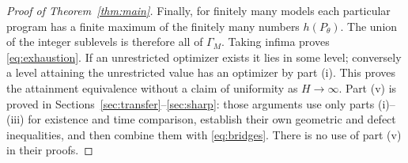 \begin{proof}[Proof of Theorem~\ref{thm:main}]
Finally, for finitely many models each particular program has a finite maximum of the finitely many numbers $h(P_\theta)$. The union of the integer sublevels is therefore all of $\Gamma_M$. Taking infima proves \eqref{eq:exhaustion}. If an unrestricted optimizer exists it lies in some level; conversely a level attaining the unrestricted value has an optimizer by part (i). This proves the attainment equivalence without a claim of uniformity as $H\to\infty$. Part (v) is proved in Sections~\ref{sec:transfer}--\ref{sec:sharp}: those arguments use only parts (i)--(iii) for existence and time comparison, establish their own geometric and defect inequalities, and then combine them with \eqref{eq:bridges}. There is no use of part (v) in their proofs.
\end{proof}
